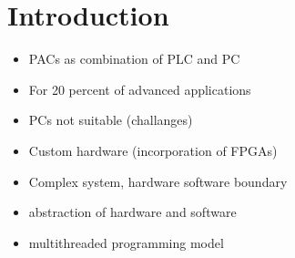 \chapter{Introduction}

\begin{itemize}
\item \acp{PAC} as combination of PLC and PC
\item For 20 percent of advanced applications
\item PCs not suitable (challanges)
\item Custom hardware (incorporation of FPGAs)
\item Complex system, hardware software boundary
\item abstraction of hardware and software
\item multithreaded programming model
\end{itemize}


